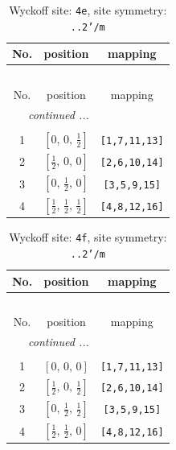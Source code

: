 \documentclass[fleqn,8pt]{jsarticle}
\begin{document}
\renewcommand{\arraystretch}{1.2}
\begin{longtable}{ccc}
\caption{Wyckoff site: {\tt 4e}, site symmetry: {\tt ..2'/m}}
 \\
 \hline \hline
No. & position & mapping \\ \hline \endfirsthead

\multicolumn{2}{l}{\tablename\ \thetable{}} \\
 \hline \hline
No. & position & mapping \\ \hline \endhead

 \hline \hline
\multicolumn{2}{r}{\footnotesize\it continued ...} \\ \endfoot

 \hline \hline
\multicolumn{2}{r}{} \\ \endlastfoot

1 & $\left[ 0,\, 0,\, \frac{1}{2} \right]$ & {\tt [1,7,11,13]} \\ \hline
2 & $\left[ \frac{1}{2},\, 0,\, 0 \right]$ & {\tt [2,6,10,14]} \\ \hline
3 & $\left[ 0,\, \frac{1}{2},\, 0 \right]$ & {\tt [3,5,9,15]} \\ \hline
4 & $\left[ \frac{1}{2},\, \frac{1}{2},\, \frac{1}{2} \right]$ & {\tt [4,8,12,16]} \\
\end{longtable}
\renewcommand{\arraystretch}{1.2}
\begin{longtable}{ccc}
\caption{Wyckoff site: {\tt 4f}, site symmetry: {\tt ..2'/m}}
 \\
 \hline \hline
No. & position & mapping \\ \hline \endfirsthead

\multicolumn{2}{l}{\tablename\ \thetable{}} \\
 \hline \hline
No. & position & mapping \\ \hline \endhead

 \hline \hline
\multicolumn{2}{r}{\footnotesize\it continued ...} \\ \endfoot

 \hline \hline
\multicolumn{2}{r}{} \\ \endlastfoot

1 & $\left[ 0,\, 0,\, 0 \right]$ & {\tt [1,7,11,13]} \\ \hline
2 & $\left[ \frac{1}{2},\, 0,\, \frac{1}{2} \right]$ & {\tt [2,6,10,14]} \\ \hline
3 & $\left[ 0,\, \frac{1}{2},\, \frac{1}{2} \right]$ & {\tt [3,5,9,15]} \\ \hline
4 & $\left[ \frac{1}{2},\, \frac{1}{2},\, 0 \right]$ & {\tt [4,8,12,16]} \\
\end{longtable}
\end{document}
